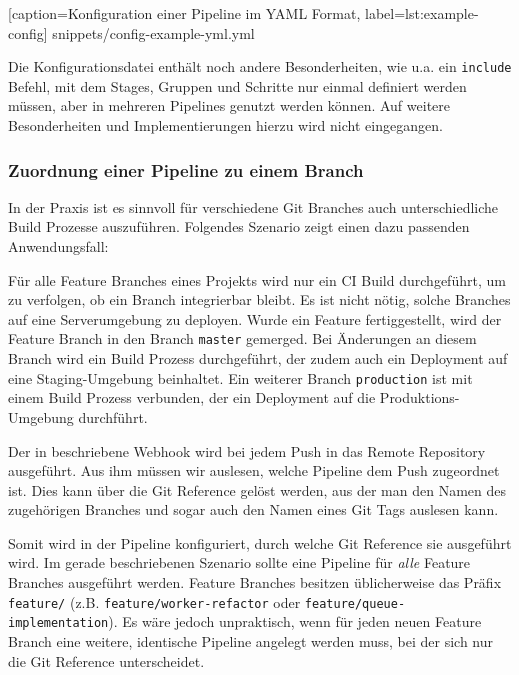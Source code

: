 
  [caption={Konfiguration einer Pipeline im YAML Format},
  label={lst:example-config}]
  {snippets/config-example-yml.yml}

Die Konfigurationsdatei enthält noch andere Besonderheiten, wie u.a. ein \texttt{include} Befehl, mit dem Stages, Gruppen und Schritte nur einmal definiert werden müssen, aber in mehreren Pipelines genutzt werden können. Auf weitere Besonderheiten und Implementierungen hierzu wird nicht eingegangen.

\subsubsection{Zuordnung einer Pipeline zu einem Branch}
\label{subsec:git-reference}

In der Praxis ist es sinnvoll für verschiedene Git Branches auch unterschiedliche Build Prozesse auszuführen. Folgendes Szenario zeigt einen dazu passenden Anwendungsfall:

Für alle Feature Branches eines Projekts wird nur ein \ac{CI} Build durchgeführt, um zu verfolgen, ob ein Branch integrierbar bleibt. Es ist nicht nötig, solche Branches auf eine Serverumgebung zu deployen. Wurde ein Feature fertiggestellt, wird der Feature Branch in den Branch \texttt{master} gemerged. Bei Änderungen an diesem Branch wird ein Build Prozess durchgeführt, der zudem auch ein Deployment auf eine Staging-Umgebung beinhaltet. Ein weiterer Branch \texttt{production} ist mit einem Build Prozess verbunden, der ein Deployment auf die Produktions-Umgebung durchführt.

Der in  beschriebene Webhook wird bei jedem Push in das Remote Repository ausgeführt. Aus ihm müssen wir auslesen, welche Pipeline dem Push zugeordnet ist. Dies kann über die Git Reference gelöst werden, aus der man den Namen des zugehörigen Branches und sogar auch den Namen eines Git Tags auslesen kann.

Somit wird in der Pipeline konfiguriert, durch welche Git Reference sie ausgeführt wird. Im gerade beschriebenen Szenario sollte eine Pipeline für \emph{alle} Feature Branches ausgeführt werden. Feature Branches besitzen üblicherweise das Präfix \texttt{feature/} (z.B. \texttt{feature/worker\allowbreak -refactor} oder \texttt{feature/queue\allowbreak -implementation}). Es wäre jedoch unpraktisch, wenn für jeden neuen Feature Branch eine weitere, identische Pipeline angelegt werden muss, bei der sich nur die Git Reference unterscheidet.

